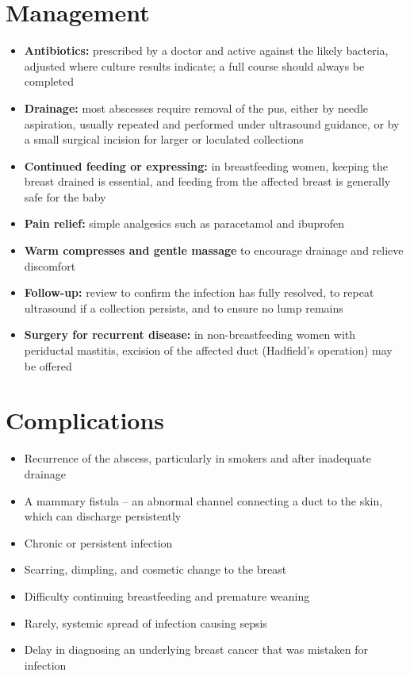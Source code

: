 \section*{Management}
\begin{itemize}
    \item \textbf{Antibiotics:} prescribed by a doctor and active against the likely bacteria, adjusted where culture results indicate; a full course should always be completed
    \item \textbf{Drainage:} most abscesses require removal of the pus, either by needle aspiration, usually repeated and performed under ultrasound guidance, or by a small surgical incision for larger or loculated collections
    \item \textbf{Continued feeding or expressing:} in breastfeeding women, keeping the breast drained is essential, and feeding from the affected breast is generally safe for the baby
    \item \textbf{Pain relief:} simple analgesics such as paracetamol and ibuprofen
    \item \textbf{Warm compresses and gentle massage} to encourage drainage and relieve discomfort
    \item \textbf{Follow-up:} review to confirm the infection has fully resolved, to repeat ultrasound if a collection persists, and to ensure no lump remains
    \item \textbf{Surgery for recurrent disease:} in non-breastfeeding women with periductal mastitis, excision of the affected duct (Hadfield's operation) may be offered
\end{itemize}

\section*{Complications}
\begin{itemize}
    \item Recurrence of the abscess, particularly in smokers and after inadequate drainage
    \item A mammary fistula -- an abnormal channel connecting a duct to the skin, which can discharge persistently
    \item Chronic or persistent infection
    \item Scarring, dimpling, and cosmetic change to the breast
    \item Difficulty continuing breastfeeding and premature weaning
    \item Rarely, systemic spread of infection causing sepsis
    \item Delay in diagnosing an underlying breast cancer that was mistaken for infection
\end{itemize}

